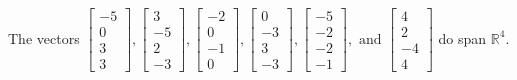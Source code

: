 \begin{exercise}
\begin{exerciseStatement}
  \end{exerciseStatement}
  \begin{exerciseAnswer}
   The vectors \(\left[\begin{array}{r}
-5 \\
0 \\
3 \\
3
\end{array}\right] , \left[\begin{array}{r}
3 \\
-5 \\
2 \\
-3
\end{array}\right] , \left[\begin{array}{r}
-2 \\
0 \\
-1 \\
0
\end{array}\right] , \left[\begin{array}{r}
0 \\
-3 \\
3 \\
-3
\end{array}\right] , \left[\begin{array}{r}
-5 \\
-2 \\
-2 \\
-1
\end{array}\right] , \text{ and } \left[\begin{array}{r}
4 \\
2 \\
-4 \\
4
\end{array}\right]\) 
  	 do  
	span \(\mathbb{R}^4\).
  


  \end{exerciseAnswer}
\end{exercise}